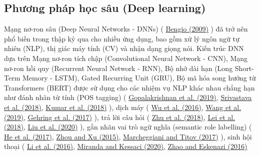 \subsection{Phương pháp học sâu (Deep learning)}\label{subsec:phuong-phap-hoc-sau-(deep-learning)}


Mạng nơ-ron sâu (Deep Neural Networks - DNNs) (
\href{https://www.sciencedirect.com/science/article/pii/S2667305323000698#br0110}{Bengio (2009)}
) đã trở nên phổ biến trong thập
kỷ qua cho nhiều ứng dụng, bao gồm xử lý ngôn ngữ tự nhiên (NLP), thị giác máy tính (CV) và nhận
dạng giọng nói. Kiến trúc DNN dựa trên Mạng nơ-ron tích chập (Convolutional Neural Network - CNN),
Mạng nơ-ron hồi quy (Recurrent Neural Network - RNN), Bộ nhớ dài hạn (Long Short-Term Memory - LSTM),
Gated Recurring Unit (GRU), Bộ mã hóa song hướng từ Transformers (BERT) được sử dụng cho các nhiệm
vụ NLP khác nhau chẳng hạn như đánh nhãn từ tính (POS tagging) (
\href{https://www.sciencedirect.com/science/article/pii/S2667305323000698#br0410}{Gopalakrishnan et al. (2019)},
\href{https://www.sciencedirect.com/science/article/pii/S2667305323000698#br1300}{Srivastava et al. (2018)},
\href{https://www.sciencedirect.com/science/article/pii/S2667305323000698#br0650}{Kumar et al. (2018)}
), dịch máy (
\href{https://www.sciencedirect.com/science/article/pii/S2667305323000698#br1470}{Wu et al. (2016)},
\href{https://www.sciencedirect.com/science/article/pii/S2667305323000698#br1430}{Wang et al. (2019)},
\href{https://www.sciencedirect.com/science/article/pii/S2667305323000698#br0400}{Gehring et al. (2017)}
), trả lời câu hỏi (
\href{https://www.sciencedirect.com/science/article/pii/S2667305323000698#br1680}{Zhu et al. (2018)},
\href{https://www.sciencedirect.com/science/article/pii/S2667305323000698#br0680}{Lei et al. (2018)},
\href{https://www.sciencedirect.com/science/article/pii/S2667305323000698#br0760}{Liu et al. (2020)}
),
gắn nhãn vai trò ngữ nghĩa (semantic role labelling) (
\href{https://www.sciencedirect.com/science/article/pii/S2667305323000698#br0480}{He et al. (2017)},
\href{https://www.sciencedirect.com/science/article/pii/S2667305323000698#br1660}{Zhou and Xu (2015)},
\href{https://www.sciencedirect.com/science/article/pii/S2667305323000698#br0800}{Marcheggiani and Titov (2017)}
), sinh hội thoại (
\href{https://www.sciencedirect.com/science/article/pii/S2667305323000698#br0700}{Li et al. (2016)},
\href{https://www.sciencedirect.com/science/article/pii/S2667305323000698#br0900}{Miranda and Kessaci (2020)},
\href{https://www.sciencedirect.com/science/article/pii/S2667305323000698#br1630}{Zhao and Eskenazi (2016)}
